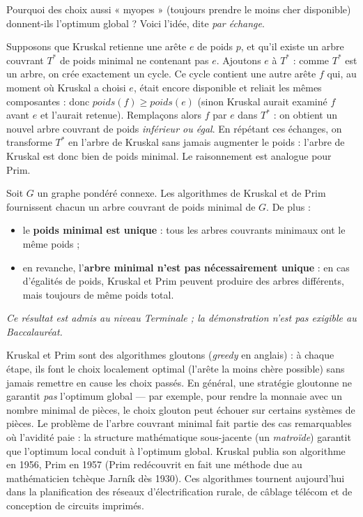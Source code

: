 \documentclass[11pt]{article}
\newcommand{\cle}[1]{{\popxbold\color{popdark}#1}}
\begin{document}
Pourquoi des choix aussi « myopes » (toujours prendre le moins cher disponible) donnent-ils l'optimum global ? Voici l'idée, dite \emph{par échange}.

\begin{experience}
Supposons que Kruskal retienne une arête $e$ de poids $p$, et qu'il existe un arbre couvrant $T^{*}$ de poids minimal ne contenant pas $e$. Ajoutons $e$ à $T^{*}$ : comme $T^{*}$ est un arbre, on crée exactement un cycle. Ce cycle contient une autre arête $f$ qui, au moment où Kruskal a choisi $e$, était encore disponible et reliait les mêmes composantes : donc $poids(f) \geq poids(e)$ (sinon Kruskal aurait examiné $f$ avant $e$ et l'aurait retenue). Remplaçons alors $f$ par $e$ dans $T^{*}$ : on obtient un nouvel arbre couvrant de poids \emph{inférieur ou égal}. En répétant ces échanges, on transforme $T^{*}$ en l'arbre de Kruskal sans jamais augmenter le poids : l'arbre de Kruskal est donc bien de poids minimal. Le raisonnement est analogue pour Prim.
\end{experience}

\begin{propriete}
Soit $G$ un graphe pondéré connexe. Les algorithmes de Kruskal et de Prim fournissent chacun un \cle{arbre couvrant de poids minimal} de $G$. De plus :
\begin{itemize}
\item le \textbf{poids minimal est unique} : tous les arbres couvrants minimaux ont le même poids ;
\item en revanche, l'\textbf{arbre minimal n'est pas nécessairement unique} : en cas d'égalités de poids, Kruskal et Prim peuvent produire des arbres différents, mais toujours de même poids total.
\end{itemize}
\emph{Ce résultat est admis au niveau Terminale ; la démonstration n'est pas exigible au Baccalauréat.}
\end{propriete}

\begin{savaistu}
Kruskal et Prim sont des \cle{algorithmes gloutons} (\emph{greedy} en anglais) : à chaque étape, ils font le choix localement optimal (l'arête la moins chère possible) sans jamais remettre en cause les choix passés. En général, une stratégie gloutonne ne garantit \emph{pas} l'optimum global — par exemple, pour rendre la monnaie avec un nombre minimal de pièces, le choix glouton peut échouer sur certains systèmes de pièces. Le problème de l'arbre couvrant minimal fait partie des cas remarquables où l'avidité paie : la structure mathématique sous-jacente (un \emph{matroïde}) garantit que l'optimum local conduit à l'optimum global. Kruskal publia son algorithme en 1956, Prim en 1957 (Prim redécouvrit en fait une méthode due au mathématicien tchèque Jarník dès 1930). Ces algorithmes tournent aujourd'hui dans la planification des réseaux d'électrification rurale, de câblage télécom et de conception de circuits imprimés.
\end{savaistu}
\end{document}
